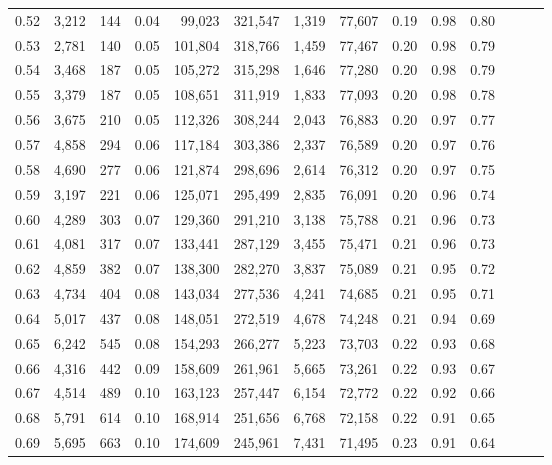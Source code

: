 \begin{tabular}{rrrrrrrrrrrrrr}
0.52 &   3,212 &    144 &  0.04 &   99,023 &  321,547 &   1,319 &  77,607 &  0.19 &  0.98 &      0.80 \\
0.53 &   2,781 &    140 &  0.05 &  101,804 &  318,766 &   1,459 &  77,467 &  0.20 &  0.98 &      0.79 \\
0.54 &   3,468 &    187 &  0.05 &  105,272 &  315,298 &   1,646 &  77,280 &  0.20 &  0.98 &      0.79 \\
0.55 &   3,379 &    187 &  0.05 &  108,651 &  311,919 &   1,833 &  77,093 &  0.20 &  0.98 &      0.78 \\
0.56 &   3,675 &    210 &  0.05 &  112,326 &  308,244 &   2,043 &  76,883 &  0.20 &  0.97 &      0.77 \\
0.57 &   4,858 &    294 &  0.06 &  117,184 &  303,386 &   2,337 &  76,589 &  0.20 &  0.97 &      0.76 \\
0.58 &   4,690 &    277 &  0.06 &  121,874 &  298,696 &   2,614 &  76,312 &  0.20 &  0.97 &      0.75 \\
0.59 &   3,197 &    221 &  0.06 &  125,071 &  295,499 &   2,835 &  76,091 &  0.20 &  0.96 &      0.74 \\
0.60 &   4,289 &    303 &  0.07 &  129,360 &  291,210 &   3,138 &  75,788 &  0.21 &  0.96 &      0.73 \\
0.61 &   4,081 &    317 &  0.07 &  133,441 &  287,129 &   3,455 &  75,471 &  0.21 &  0.96 &      0.73 \\
0.62 &   4,859 &    382 &  0.07 &  138,300 &  282,270 &   3,837 &  75,089 &  0.21 &  0.95 &      0.72 \\
0.63 &   4,734 &    404 &  0.08 &  143,034 &  277,536 &   4,241 &  74,685 &  0.21 &  0.95 &      0.71 \\
0.64 &   5,017 &    437 &  0.08 &  148,051 &  272,519 &   4,678 &  74,248 &  0.21 &  0.94 &      0.69 \\
0.65 &   6,242 &    545 &  0.08 &  154,293 &  266,277 &   5,223 &  73,703 &  0.22 &  0.93 &      0.68 \\
0.66 &   4,316 &    442 &  0.09 &  158,609 &  261,961 &   5,665 &  73,261 &  0.22 &  0.93 &      0.67 \\
0.67 &   4,514 &    489 &  0.10 &  163,123 &  257,447 &   6,154 &  72,772 &  0.22 &  0.92 &      0.66 \\
0.68 &   5,791 &    614 &  0.10 &  168,914 &  251,656 &   6,768 &  72,158 &  0.22 &  0.91 &      0.65 \\
0.69 &   5,695 &    663 &  0.10 &  174,609 &  245,961 &   7,431 &  71,495 &  0.23 &  0.91 &      0.64 \\

\end{tabular}
